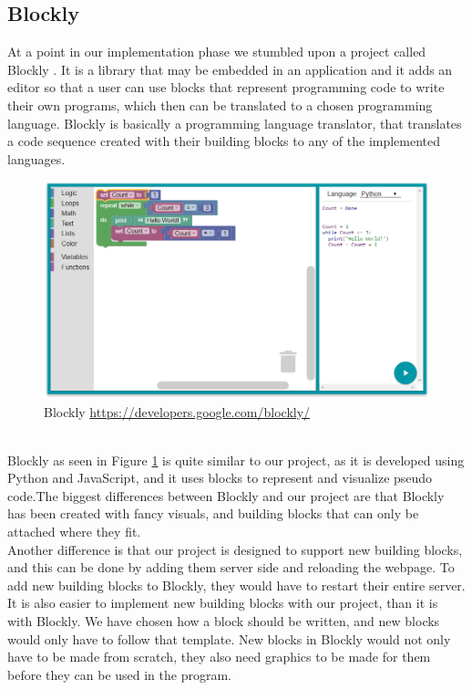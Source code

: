 \documentclass[11pt]{article}
\begin{document}
\subsection{Blockly}
At a point in our implementation phase we stumbled upon a project called Blockly \citep{Blockly}. It is a library that may be embedded in an application and it adds an editor so that a user can use blocks that represent programming code to write their own programs, which then can be translated to a chosen programming language. Blockly is basically a programming language translator, that translates a code sequence created with their building blocks to any of the implemented languages.
\begin{figure}[h]
	\centering
	\includegraphics[scale=0.4]{img/blocklypy1.PNG}
    \caption{Blockly \url{https://developers.google.com/blockly/}}
    \label{Blockly}
\end{figure}\\
Blockly as seen in Figure \ref{Blockly} is quite similar to our project, as it is developed using Python and JavaScript, and it uses blocks to represent and visualize 
pseudo code.The biggest differences between Blockly and our project are that Blockly has been created with fancy visuals, and building blocks that can only be attached where they fit.\\
Another difference is that our project is designed to support new building blocks, and this can be done by adding them server side and reloading the webpage. To add new building blocks to Blockly, they would have to restart their entire server. It is also easier to implement new building blocks with our project, than it is with Blockly. We have chosen how a block should be written, and new blocks would only have to follow that template. New blocks in Blockly would not only have to be made from scratch, they also need graphics to be made for them before they can be used in the program.
\end{document}
